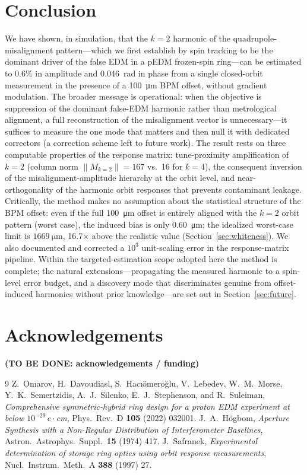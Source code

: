 \documentclass[preprint,12pt]{elsarticle}
\newcommand{\todo}[1]{{\color{red}\textbf{(TO BE DONE: #1)}}}
\begin{document}
\section{Conclusion}
\label{sec:conclusion}

We have shown, in simulation, that the $k=2$ harmonic of the
quadrupole-misalignment pattern---which we first establish by spin tracking
to be the dominant driver of the false EDM in a pEDM frozen-spin ring---can
be estimated to $0.6\%$ in amplitude and \SI{0.046}{\radian} in phase from a
single closed-orbit measurement in the presence of a \SI{100}{\micro\meter}
BPM offset, without gradient modulation. The broader message is operational:
when the objective is suppression of the dominant false-EDM harmonic rather
than metrological alignment, a full reconstruction of the misalignment
vector is unnecessary---it suffices to measure the one mode that matters and
then null it with dedicated correctors (a correction scheme left to future
work). The result rests on three computable properties of the
response matrix: tune-proximity amplification of $k=2$ (column norm
$\|M_{k=2}\|=167$ vs.\ 16 for $k=4$), the consequent inversion of the
misalignment-amplitude hierarchy at the orbit level, and near-orthogonality
of the harmonic orbit responses that prevents contaminant leakage.
Critically, the method makes no assumption about the statistical structure
of the BPM offset: even if the full \SI{100}{\micro\meter} offset is
entirely aligned with the $k=2$ orbit pattern (worst case), the induced
bias is only \SI{0.60}{\micro\meter}; the idealized worst-case limit is $\SI{1669}{\micro\meter}$,
16.7$\times$ above the realistic value (Section~\ref{sec:whiteness}).
We also documented and corrected a $10^3$ unit-scaling error in the
response-matrix pipeline. Within the targeted-estimation scope adopted here
the method is complete; the natural extensions---propagating the measured
harmonic to a spin-level error budget, and a discovery mode that
discriminates genuine from offset-induced harmonics without prior
knowledge---are set out in Section~\ref{sec:future}.

\section*{Acknowledgements}
\todo{acknowledgements / funding}

\begin{thebibliography}{9}
 Z.~Omarov, H.~Davoudiasl, S.~Hac\i\"omero\u{g}lu,
V.~Lebedev, W.~M.~Morse, Y.~K.~Semertzidis, A.~J.~Silenko,
E.~J.~Stephenson, and R.~Suleiman, \emph{Comprehensive symmetric-hybrid
ring design for a proton EDM experiment at below $10^{-29}\,e\cdot$cm},
Phys.\ Rev.\ D \textbf{105} (2022) 032001.
 J.~A.~H\"ogbom, \emph{Aperture Synthesis with a
Non-Regular Distribution of Interferometer Baselines}, Astron.\ Astrophys.\
Suppl.\ \textbf{15} (1974) 417.
 J.~Safranek, \emph{Experimental determination of storage
ring optics using orbit response measurements}, Nucl.\ Instrum.\ Meth.\ A
\textbf{388} (1997) 27.
\end{thebibliography}
\end{document}
